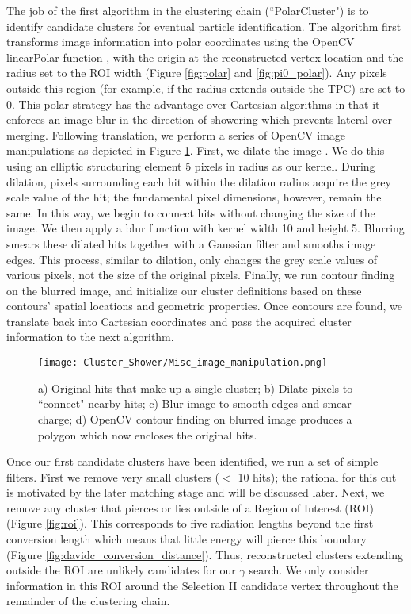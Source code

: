\par The job of the first algorithm in the clustering chain (``PolarCluster") is to identify candidate clusters for eventual particle identification. The algorithm first transforms image information into polar coordinates using the OpenCV linearPolar function \cite{bib:linearPolar}, with the origin at the reconstructed vertex location and the radius set to the ROI width (Figure \ref{fig:polar} and \ref{fig:pi0_polar}). Any pixels outside this region (for example, if the radius extends outside the TPC) are set to 0. This polar strategy has the advantage over Cartesian algorithms in that it enforces an image blur in the direction of showering which prevents lateral over-merging. Following translation, we perform a series of OpenCV image manipulations as depicted in Figure \ref{fig:sbc}. First, we dilate the image \cite{bib:dilate}. We do this using an elliptic structuring element \cite{bib:structuringElement} 5 pixels in radius as our kernel. During dilation, pixels surrounding each hit within the dilation radius acquire the grey scale value of the hit; the fundamental pixel dimensions, however, remain the same. In this way, we begin to connect hits without changing the size of the image. We then apply a blur function \cite{bib:blur} with kernel width 10 and height 5. Blurring smears these dilated hits together with a Gaussian filter and smooths image edges. This process, similar to dilation, only changes the grey scale values of various pixels, not the size of the original pixels. Finally, we run contour finding \cite{bib:contourFinding} on the blurred image, and initialize our cluster definitions based on these contours' spatial locations and geometric properties.  Once contours are found, we translate back into Cartesian coordinates and pass the acquired cluster information to the next algorithm.

\begin{figure}[H]
\centering
\texttt{[image: Cluster\_Shower/Misc\_image\_manipulation.png]}
\caption{ a) Original hits that make up a single cluster; b) Dilate pixels to ``connect" nearby hits; c) Blur image to smooth edges and smear charge; d) OpenCV contour finding on blurred image produces a polygon which now encloses the original hits.}
\label{fig:sbc}
\end{figure}

\par Once our first candidate clusters have been identified, we run a set of simple filters.  First we remove very small clusters ($<$ 10 hits); the rational for this cut is motivated by the later matching stage and will be discussed later. Next, we remove any cluster that pierces or lies outside of a Region of Interest (ROI)  (Figure \ref{fig:roi}).  This corresponds to five radiation lengths beyond the first conversion length which means that little energy will pierce this boundary (Figure \ref{fig:davidc_conversion_distance}). Thus, reconstructed clusters extending outside the ROI are unlikely candidates for our $\gamma$ search. We only consider information in this ROI around the Selection II candidate vertex throughout the remainder of the clustering chain.

